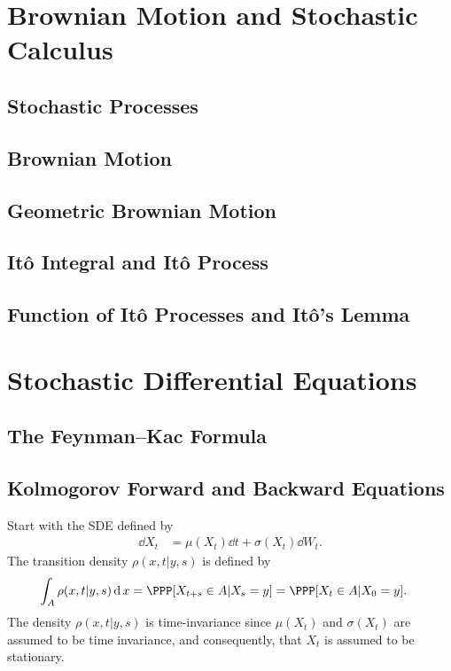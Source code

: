 \section{Brownian Motion and Stochastic Calculus}
\subsection{Stochastic Processes}
\subsection{Brownian Motion}
\subsection{Geometric Brownian Motion}
\subsection{It\^o Integral and It\^o Process}
\subsection{Function of It\^o Processes and It\^o's Lemma}

\section{Stochastic Differential Equations}
\subsection{The Feynman--Kac Formula}
\subsection{Kolmogorov Forward and Backward Equations}
Start with the SDE defined by
\begin{align}
  \dd X_t & = \mu(X_t)\dd t + \sigma(X_t) \dd W_t.
\end{align}
The transition density $\rho(x,t|y,s)$ is defined by
\begin{align}
  \int_A \rho(x,t|y,s) \dd x & = \PPP[X_{t+s} \in A | X_s = y] = \PPP[X_t \in A | X_0 = y].
\end{align}
The density $\rho(x, t | y, s)$ is time-invariance since $\mu(X_t)$ and $\sigma(X_t)$ are assumed to be time invariance, and consequently, that $X_t$ is assumed to be stationary.

